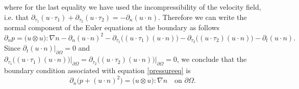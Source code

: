 \documentclass[12pt,a4paper]{article}
\theoremstyle{definition}
\theoremstyle{remark}
\numberwithin{equation}{section}
\begin{document}
where for the last equality we have used the incompressibility of the velocity field, i.e. that $\partial_{\tau_1} (u \cdot \tau_1) + \partial_{\tau_2} (u \cdot \tau_2) = -  \partial_n (u\cdot n)$. Therefore we can write the normal component of the Euler equations at the boundary as follows
\begin{equation*}
\partial_n p = \big( u \otimes u \big) : \nabla n - \partial_n (u \cdot n)^2 - \partial_{\tau_1} \big( (u \cdot \tau_1) (u \cdot n) \big) - \partial_{\tau_2} \big( (u \cdot \tau_2) (u \cdot n) \big) - \partial_t (u \cdot n).
\end{equation*}
Since $\partial_t (u \cdot n) \lvert_{\partial \Omega} = 0$ and $\partial_{\tau_1} \big( (u \cdot \tau_1) (u \cdot n) \big) \lvert_{\partial \Omega} = \partial_{\tau_2} \big( (u \cdot \tau_2) (u \cdot n) \big) \lvert_{\partial \Omega} = 0$, we conclude that the boundary condition associated with equation \eqref{pressureeq} is
\begin{equation} \label{boundarycondition}
\partial_n \big( p + (u \cdot n)^2 \big) = \big( u \otimes u \big) : \nabla n \quad \text{on } \partial \Omega.
\end{equation}
\end{document}
